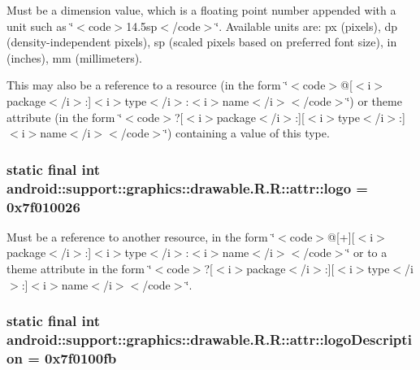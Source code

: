 Must be a dimension value, which is a floating point number appended with a unit such as \char`\"{}$<$code$>$14.5sp$<$/code$>$\char`\"{}. Available units are: px (pixels), dp (density-independent pixels), sp (scaled pixels based on preferred font size), in (inches), mm (millimeters). 

This may also be a reference to a resource (in the form \char`\"{}$<$code$>$@\mbox{[}$<$i$>$package$<$/i$>$:\mbox{]}$<$i$>$type$<$/i$>$:$<$i$>$name$<$/i$>$$<$/code$>$\char`\"{}) or theme attribute (in the form \char`\"{}$<$code$>$?\mbox{[}$<$i$>$package$<$/i$>$:\mbox{]}\mbox{[}$<$i$>$type$<$/i$>$:\mbox{]}$<$i$>$name$<$/i$>$$<$/code$>$\char`\"{}) containing a value of this type. \hypertarget{classandroid_1_1support_1_1graphics_1_1drawable_1_1_r_1_1attr_8b301a7ff818c7d19748787407aca105}{
\subsubsection[{logo}]{\setlength{\rightskip}{0pt plus 5cm}static final int android::support::graphics::drawable.R.R::attr::logo = 0x7f010026}}
\label{classandroid_1_1support_1_1graphics_1_1drawable_1_1_r_1_1attr_8b301a7ff818c7d19748787407aca105}


Must be a reference to another resource, in the form \char`\"{}$<$code$>$@\mbox{[}+\mbox{]}\mbox{[}$<$i$>$package$<$/i$>$:\mbox{]}$<$i$>$type$<$/i$>$:$<$i$>$name$<$/i$>$$<$/code$>$\char`\"{} or to a theme attribute in the form \char`\"{}$<$code$>$?\mbox{[}$<$i$>$package$<$/i$>$:\mbox{]}\mbox{[}$<$i$>$type$<$/i$>$:\mbox{]}$<$i$>$name$<$/i$>$$<$/code$>$\char`\"{}. \hypertarget{classandroid_1_1support_1_1graphics_1_1drawable_1_1_r_1_1attr_d66cd0a981c98ff2fffccd82d63a6cfa}{
\subsubsection[{logoDescription}]{\setlength{\rightskip}{0pt plus 5cm}static final int android::support::graphics::drawable.R.R::attr::logoDescription = 0x7f0100fb}}
\label{classandroid_1_1support_1_1graphics_1_1drawable_1_1_r_1_1attr_d66cd0a981c98ff2fffccd82d63a6cfa}


